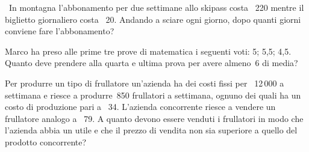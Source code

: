 
\begin{esercizio}[*]
\label{ese:21.23}
\ In montagna l'abbonamento per due settimane allo
skipass costa \officialeuro\ 220 mentre il biglietto giornaliero costa
\officialeuro\ 20. Andando a sciare ogni giorno, dopo quanti giorni
conviene fare l'abbonamento? 
\end{esercizio}

\begin{esercizio}[*]
\label{ese:21.24}
Marco ha preso alle prime tre prove di matematica i seguenti voti: 5;
5,5; 4,5. Quanto deve prendere alla quarta e ultima prova per avere 
almeno~6 di media? 
\end{esercizio}

\begin{esercizio}
\label{ese:21.25}
Per produrre un tipo di frullatore un'azienda ha dei
costi fissi per \officialeuro\ 12\,000 a settimana e riesce a produrre~850
frullatori a settimana, ognuno dei quali ha un costo di produzione pari
a \officialeuro\ 34. L'azienda concorrente riesce a
vendere un frullatore analogo a \officialeuro\ 79. A quanto devono essere
venduti i frullatori in modo che l'azienda abbia un
utile e che il prezzo di vendita non sia superiore a quello del
prodotto concorrente?
\end{esercizio}

